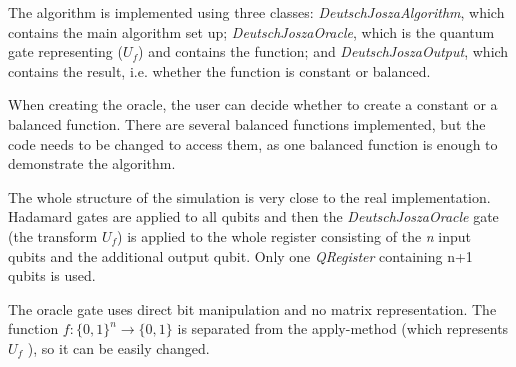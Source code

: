 The algorithm is implemented using three classes: \emph{DeutschJoszaAlgorithm}, which contains the main algorithm set up; \emph{DeutschJoszaOracle}, which is the quantum gate representing (\( U_f \)) and contains the function; and \emph{DeutschJoszaOutput}, which contains the result, i.e. whether the function is constant or balanced.

When creating the oracle, the user can decide whether to create a constant or a balanced function. There are several balanced functions implemented, but the code needs to be changed to access them, as one balanced function is enough to demonstrate the algorithm.

The whole structure of the simulation is very close to the real implementation. Hadamard gates are applied to all qubits and then the \emph{DeutschJoszaOracle} gate (the transform \begin{math} U_f \end{math}) is applied to the whole register consisting of the \emph{n} input qubits and the additional output qubit. Only one \emph{QRegister} containing n+1 qubits is used.

The oracle gate uses direct bit manipulation and no matrix representation. The function \( f : \{0,1\}^n \to \{ 0,1 \} \) is separated from the apply-method (which represents \( U_f \) ), so it can be easily changed.